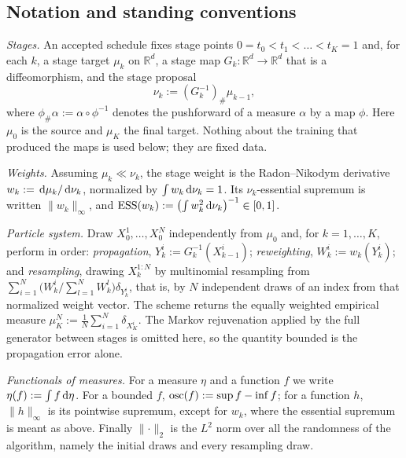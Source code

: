 \documentclass{article}
\begin{document}
{\color{red}
\subsection*{Notation and standing conventions}

\emph{Stages.} An accepted schedule fixes stage points $0=t_0<t_1<\dots<t_K=1$ and, for each $k$, a stage target $\mu_k$ on $\mathbb R^d$, a stage map $G_k:\mathbb R^d\to\mathbb R^d$ that is a diffeomorphism, and the stage proposal
\begin{equation*}
    \nu_k:=(G_k^{-1})_{\#}\mu_{k-1},
\end{equation*}
where $\phi_{\#}\alpha:=\alpha\circ\phi^{-1}$ denotes the pushforward of a measure $\alpha$ by a map $\phi$. Here $\mu_0$ is the source and $\mu_K$ the final target. Nothing about the training that produced the maps is used below; they are fixed data.

\emph{Weights.} Assuming $\mu_k\ll\nu_k$, the stage weight is the Radon--Nikodym derivative $w_k:=\,\mathrm d\mu_k/\,\mathrm d\nu_k$, normalized by $\int w_k\,\mathrm d\nu_k=1$. Its $\nu_k$-essential supremum is written $\lVert w_k\rVert_\infty$, and $\mathrm{ESS}(w_k):=\bigl(\int w_k^2\,\mathrm d\nu_k\bigr)^{-1}\in[0,1]$.

\emph{Particle system.} Draw $X_0^1,\dots,X_0^N$ independently from $\mu_0$ and, for $k=1,\dots,K$, perform in order:
\emph{propagation}, $Y_k^i:=G_k^{-1}(X_{k-1}^i)$;
\emph{reweighting}, $W_k^i:=w_k(Y_k^i)$;
and \emph{resampling}, drawing $X_k^{1:N}$ by multinomial resampling from $\sum_{i=1}^N\bigl(W_k^i/\sum_{l=1}^NW_k^l\bigr)\delta_{Y_k^i}$, that is, by $N$ independent draws of an index from that normalized weight vector. The scheme returns the equally weighted empirical measure $\mu_K^N:=\frac1N\sum_{i=1}^N\delta_{X_K^i}$. The Markov rejuvenation applied by the full generator between stages is omitted here, so the quantity bounded is the propagation error alone.

\emph{Functionals of measures.} For a measure $\eta$ and a function $f$ we write $\eta(f):=\int f\,\mathrm d\eta$. For a bounded $f$, $\operatorname{osc}(f):=\sup f-\inf f$; for a function $h$, $\lVert h\rVert_\infty$ is its pointwise supremum, except for $w_k$, where the essential supremum is meant as above. Finally $\lVert\cdot\rVert_2$ is the $L^2$ norm over all the randomness of the algorithm, namely the initial draws and every resampling draw.

}
\end{document}
